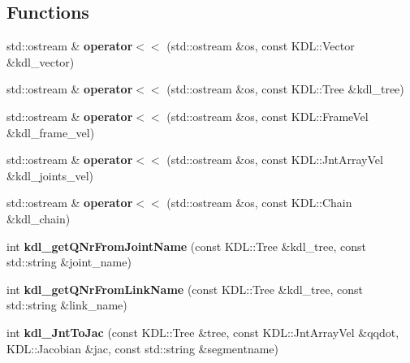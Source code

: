 \subsection*{Functions}
\begin{DoxyCompactItemize}
\item 
\hypertarget{namespacehiqp_ae25bb9b7205ab2630606197e8a35af8f}{std\-::ostream \& {\bfseries operator$<$$<$} (std\-::ostream \&os, const K\-D\-L\-::\-Vector \&kdl\-\_\-vector)}\label{namespacehiqp_ae25bb9b7205ab2630606197e8a35af8f}

\item 
\hypertarget{namespacehiqp_ace17cd6f24f52ba09f129ab50f435f99}{std\-::ostream \& {\bfseries operator$<$$<$} (std\-::ostream \&os, const K\-D\-L\-::\-Tree \&kdl\-\_\-tree)}\label{namespacehiqp_ace17cd6f24f52ba09f129ab50f435f99}

\item 
\hypertarget{namespacehiqp_a59fe109d0df644e9ead2b56f8d86bf89}{std\-::ostream \& {\bfseries operator$<$$<$} (std\-::ostream \&os, const K\-D\-L\-::\-Frame\-Vel \&kdl\-\_\-frame\-\_\-vel)}\label{namespacehiqp_a59fe109d0df644e9ead2b56f8d86bf89}

\item 
\hypertarget{namespacehiqp_a33d4a297971bc3e2996aa1f3194b0e30}{std\-::ostream \& {\bfseries operator$<$$<$} (std\-::ostream \&os, const K\-D\-L\-::\-Jnt\-Array\-Vel \&kdl\-\_\-joints\-\_\-vel)}\label{namespacehiqp_a33d4a297971bc3e2996aa1f3194b0e30}

\item 
\hypertarget{namespacehiqp_a6a26da69453463527d0b4c99884983c9}{std\-::ostream \& {\bfseries operator$<$$<$} (std\-::ostream \&os, const K\-D\-L\-::\-Chain \&kdl\-\_\-chain)}\label{namespacehiqp_a6a26da69453463527d0b4c99884983c9}

\item 
\hypertarget{namespacehiqp_a95f3af7af45e7c81eda13572f2d3cc38}{int {\bfseries kdl\-\_\-get\-Q\-Nr\-From\-Joint\-Name} (const K\-D\-L\-::\-Tree \&kdl\-\_\-tree, const std\-::string \&joint\-\_\-name)}\label{namespacehiqp_a95f3af7af45e7c81eda13572f2d3cc38}

\item 
\hypertarget{namespacehiqp_afc65617e444dcefe5ca39e0dac2a17b2}{int {\bfseries kdl\-\_\-get\-Q\-Nr\-From\-Link\-Name} (const K\-D\-L\-::\-Tree \&kdl\-\_\-tree, const std\-::string \&link\-\_\-name)}\label{namespacehiqp_afc65617e444dcefe5ca39e0dac2a17b2}

\item 
\hypertarget{namespacehiqp_a9266d35577397a64d24935da167b406a}{int {\bfseries kdl\-\_\-\-Jnt\-To\-Jac} (const K\-D\-L\-::\-Tree \&tree, const K\-D\-L\-::\-Jnt\-Array\-Vel \&qqdot, K\-D\-L\-::\-Jacobian \&jac, const std\-::string \&segmentname)}\label{namespacehiqp_a9266d35577397a64d24935da167b406a}


\end{DoxyCompactItemize}
